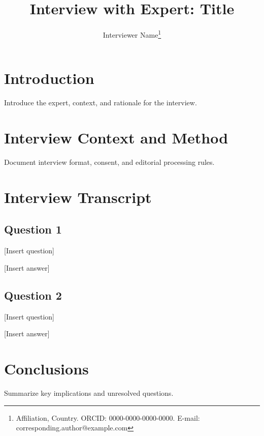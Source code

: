\documentclass[12pt,a4paper]{article}
\title{Interview with Expert: Title}
\author{Interviewer Name\footnote{Affiliation, Country. ORCID: 0000-0000-0000-0000. E-mail: corresponding.author@example.com}}
\date{}
\begin{document}
\maketitle

\begin{sdqabstract}
\end{sdqabstract}


\section{Introduction}
Introduce the expert, context, and rationale for the interview.

\section{Interview Context and Method}
Document interview format, consent, and editorial processing rules.

\section{Interview Transcript}
\subsection{Question 1}
[Insert question]

[Insert answer]

\subsection{Question 2}
[Insert question]

[Insert answer]

\section{Conclusions}
Summarize key implications and unresolved questions.

\printbibliography[title={References}]
\end{document}
